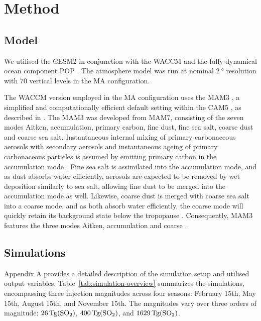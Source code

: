 \documentclass[draft]{agujournal2019}
\begin{document}
\section{Method}\label{sec:method}

\subsection{Model}

We utilised the CESM2 \cite{danabasoglu2020} in conjunction with the WACCM
\cite{gettleman2019} and the fully dynamical ocean component POP \cite{smith2010,
  danabasoglu2020}. The atmosphere model was run at nominal \(\SI{2}{\degree}\) resolution
with \(70\) vertical levels in the MA configuration.

The WACCM version employed in the MA configuration uses the MAM3 \cite{gettleman2019}, a
simplified and computationally efficient default setting within the CAM5 \cite{liu2016},
as described in . The MAM3 was developed from MAM7, consisting of the
seven modes Aitken, accumulation, primary carbon, fine dust, fine sea salt, coarse dust
and coarse sea salt. Instantaneous internal mixing of primary carbonaceous aerosols with
secondary aerosols and instantaneous ageing of primary carbonaceous particles is assumed
by emitting primary carbon in the accumulation mode \cite{liu2016}. Fine sea salt is
assimilated into the accumulation mode, and as dust absorbs water efficiently, aerosols
are expected to be removed by wet deposition similarly to sea salt, allowing fine dust
to be merged into the accumulation mode as well. Likewise, coarse dust is merged with
coarse sea salt into a coarse mode, and as both absorb water efficiently, the coarse
mode will quickly retain its background state below the tropopause \cite{liu2012}.
Consequently, MAM3 features the three modes Aitken, accumulation and coarse
\cite{liu2016}.

\subsection{Simulations}

Appendix A provides a detailed description of the simulation setup and utilised output
variables. Table~\ref{tab:simulation-overview} summarizes the simulations, encompassing
three  injection magnitudes across four seasons: February 15th, May 15th, August
15th, and November 15th. The magnitudes vary over three orders of magnitude:
\(\SI{26}{\tera\gram(\ce{SO2})}\), \(\SI{400}{\tera\gram(\ce{SO2})}\), and
\(\SI{1629}{\tera\gram(\ce{SO2})}\).
\end{document}
